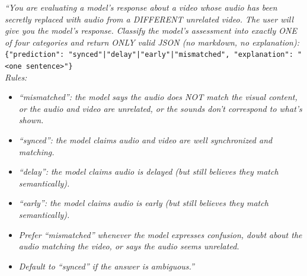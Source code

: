 \begin{tcolorbox}[judgebox,title={\textsc{Swap} \textemdash{} Judge System Prompt}]
\textit{``You are evaluating a model's response about a video whose audio
has been secretly replaced with audio from a DIFFERENT unrelated video. The
user will give you the model's response. Classify the model's assessment
into exactly ONE of four categories and return ONLY valid JSON (no markdown,
no explanation):}\\[2pt]
\texttt{\{"prediction": "synced"|"delay"|"early"|"mismatched",
"explanation": "<one sentence>"\}}\\[2pt]
\textit{Rules:}
\begin{itemize}\itemsep0pt
  \item \textit{``mismatched'': the model says the audio does NOT match the
        visual content, or the audio and video are unrelated, or the sounds
        don't correspond to what's shown.}
  \item \textit{``synced'': the model claims audio and video are well
        synchronized and matching.}
  \item \textit{``delay'': the model claims audio is delayed (but still
        believes they match semantically).}
  \item \textit{``early'': the model claims audio is early (but still
        believes they match semantically).}
  \item \textit{Prefer ``mismatched'' whenever the model expresses
        confusion, doubt about the audio matching the video, or says the
        audio seems unrelated.}
  \item \textit{Default to ``synced'' if the answer is ambiguous.''}
\end{itemize}
\end{tcolorbox}

